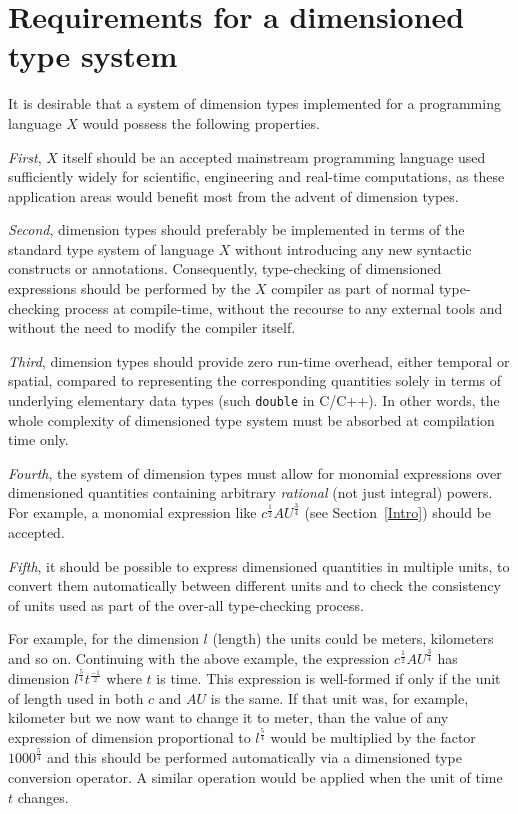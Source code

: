 \documentclass[11pt,a4paper]{article}
\begin{document}
\section{Requirements for a dimensioned type system}

It is desirable that a system of dimension types implemented for a programming
language $X$ would possess the following properties.

\textit{First}, $X$ itself should be an accepted mainstream programming
language used sufficiently widely for scientific, engineering and real-time
computations, as these application areas would benefit most from the advent of
dimension types.

\textit{Second}, dimension types should preferably be implemented in terms of
the standard type system of language $X$ without introducing any new syntactic
constructs or annotations. Consequently, type-checking of dimensioned
expressions should be performed by the $X$ compiler as part of normal
type-checking process at compile-time, without the recourse to any external
tools and without the need to modify the compiler itself.

\textit{Third}, dimension types should provide zero run-time overhead, either
temporal or spatial, compared to representing the corresponding quantities
solely in terms of underlying elementary data types (such \texttt{double} in
C/C++). In other words, the whole complexity of dimensioned type system must
be absorbed at compilation time only.

\textit{Fourth}, the system of dimension types must allow for monomial
expressions over dimensioned quantities containing arbitrary \textit{rational}
(not just integral) powers. For example, a monomial expression like
$ c^\frac{1}{2} AU^\frac{3}{4} $ (see Section~\ref{Intro}) should be accepted.

\textit{Fifth}, it should be possible to express dimensioned quantities in
multiple units, to convert them automatically between different units and to
check the consistency of units used as part of the over-all type-checking
process.

For example, for the dimension $l$ (length) the units could be meters,
kilometers and so on. Continuing with the above example, the expression
$ c^\frac{1}{2} AU^\frac{3}{4} $ has dimension
$ l^\frac{5}{4} t^\frac{-1}{2} $ where $t$ is time. This expression is
well-formed if only if the unit of length used in both $c$ and $AU$ is the same.
If that unit was, for example, kilometer but we now want to change it to
meter, than the value of any expression of dimension proportional to
$ l^\frac{5}{4} $ would be multiplied by the factor $ 1000^\frac{5}{4} $ and
this should be performed automatically via a dimensioned type conversion
operator. A similar operation would be applied when the unit of time $t$
changes.
\end{document}
